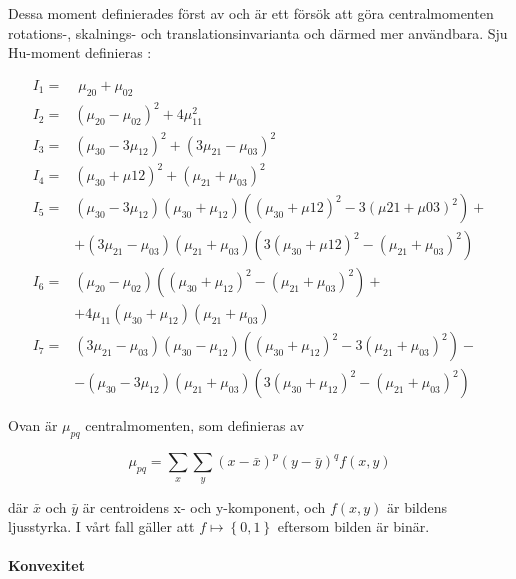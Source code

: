 \documentclass[../rapport_MVEX01-11-05]{subfiles}
\begin{document}
Dessa moment definierades först av  och är ett försök att
göra centralmomenten rotations-, skalnings- och translationsinvarianta och
därmed mer användbara. Sju Hu-moment definieras \cite[s.~185]{Hu62}:

\begin{align*}
	I_1 =& \;\mu_{20} + \mu_{02}\\
	I_2 =& \left(\mu_{20} - \mu_{02}\right)^2 + 4\mu^2_{11}\\
	I_3 =& \left(\mu_{30} - 3\mu_{12}\right)^2 +
	       \left(3\mu_{21} - \mu_{03}\right)^2\\
	I_4 =& \left(\mu_{30} + \mu{12}\right)^2 +
 	       \left(\mu_{21} + \mu_{03}\right)^2\\
	I_5 =& \left(\mu_{30} - 3\mu_{12}\right)
	       \left(\mu_{30} + \mu_{12}\right)
	       \left(\left(\mu_{30}+\mu{12}\right)^2 -
	       3\left(\mu{21}+\mu{03}\right)^2\right) + \\
 	    &+ \left(3\mu_{21} - \mu_{03}\right)\left(\mu_{21} + \mu_{03}\right)
	       \left(3\left(\mu_{30} + \mu{12}\right)^2 -
	       \left(\mu_{21} + \mu_{03}\right)^2\right)\\
	I_6 =& \left(\mu_{20}-\mu_{02}\right)
	       \left(\left(\mu_{30}+\mu_{12}\right)^2 -
	       \left(\mu_{21}+\mu_{03}\right)^2\right) + \\
	    &+ 4\mu_{11}\left(\mu_{30}+\mu_{12}\right)
	       \left(\mu_{21}+\mu_{03}\right)\\
	I_7 =& \left(3\mu_{21}-\mu_{03}\right)\left(\mu_{30}-\mu_{12}\right)
	       \left(\left(\mu_{30}+\mu_{12}\right)^2 - 
	       3\left(\mu_{21}+\mu_{03}\right)^2\right) - \\
	    &- \left(\mu_{30} - 3\mu_{12}\right)\left(\mu_{21}+\mu_{03}\right)
	       \left(3\left(\mu_{30}+\mu_{12}\right)^2 - 
  	     \left(\mu_{21}+\mu_{03}\right)^2\right)
\end{align*}

Ovan är $\mu_{pq}$ centralmomenten, som definieras av

\begin{equation*}
	\mu_{pq} = \sum\limits_x\sum\limits_y
	           \left(x-\bar{x}\right)^p
	           \left(y-\bar{y}\right)^q
	           f(x,y)
\end{equation*}

där $\bar{x}$ och $\bar{y}$ är centroidens x- och y-komponent, och $f(x,y)$ är
bildens ljusstyrka. I vårt fall gäller att $f\mapsto\left\{0,1\right\}$
eftersom bilden är binär.

\paragraph{Konvexitet}
\end{document}
